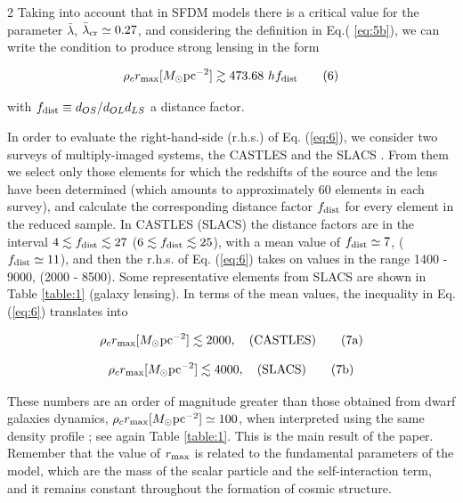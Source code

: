 \documentclass {article}
\begin{document}
\begin {multicols} {2}
Taking into account that in SFDM models there is a critical value for the parameter  $\bar{\lambda}$,  $\bar{\lambda}_{\textup{cr}} \simeq 0.27$, and considering the definition in Eq.( \ref{eq:5b}), we can write the condition to produce strong lensing in the form

\begin{equation} \label{eq:6}
\rho_c r_{\textup{max}} [M_{\odot} \textup{pc}^{-2}] \gtrsim 473.68 \ h f_{\textup{dist}} \tag{6}
\end{equation}

with $f_{\textup{dist}} \equiv d_{OS} / d_{OL} d_{LS}$ a distance factor.


In order to evaluate the right-hand-side (r.h.s.) of Eq. (\ref{eq:6}), we consider two surveys of multiply-imaged systems, the CASTLES \cite{falco1999castles} and the SLACS \cite{Bolton_2008}. From them we select only those elements for which the redshifts of the source and the lens have been determined (which amounts to approximately 60 elements in each survey), and calculate the corresponding distance factor $f_{\textup{dist}}$ for every element in the reduced sample. In CASTLES (SLACS) the distance factors are in the interval $4 \lesssim f_{\textup{dist}} \lesssim 27$ ($6 \lesssim f_{\textup{dist}} \lesssim 25$), with a mean value of $f_{\textup{dist}} \simeq 7$, ($f_{\textup{dist}} \simeq 11$), and then the r.h.s. of Eq. (\ref{eq:6}) takes on values in the range 1400 - 9000, (2000 - 8500). Some representative elements from SLACS are shown in Table \ref{table:1} (galaxy lensing). In terms of the mean values, the inequality in Eq. (\ref{eq:6}) translates into

\begin{equation} \label{eq:7a}
\rho_c r_{\textup{max}} [ M_{\odot} \textup{pc}^{-2} ] \lesssim 2000,\ \ \ \textup{(CASTLES)} \tag{7a}
\end{equation}

\begin{equation} \label{eq:7b}
\rho_c r_{\textup{max}} [ M_{\odot} \textup{pc}^{-2} ] \lesssim 4000,\ \ \ \textup{(SLACS)} \tag{7b}
\end{equation}

These numbers are an order of magnitude greater than those obtained from dwarf galaxies dynamics, $\rho_c r_{\textup{max}}[ M_{\odot} \textup{pc}^{-2} ] \simeq 100$, when interpreted using the same density profile \cite{Lora_2012}; see again Table \ref{table:1}. This is the main result of the paper. Remember that the value of $r_{\textup{max}}$ is related to the fundamental parameters of the model, which are the mass of the scalar particle and the self-interaction term, and it remains constant throughout the formation of cosmic structure.



\end{multicols}
\end{document}
